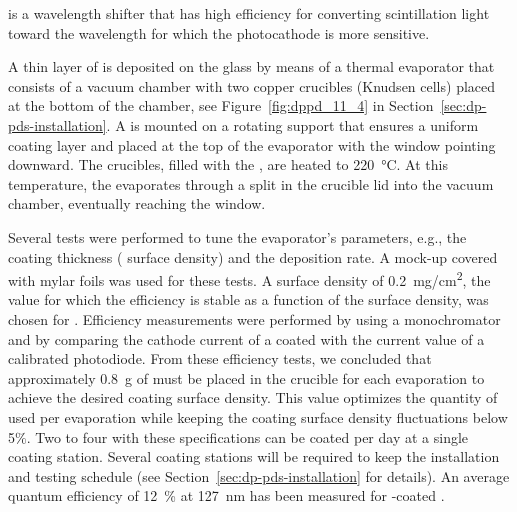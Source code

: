  is a wavelength shifter that has high efficiency for converting  scintillation  light toward the %
wavelength for which the  photocathode is more sensitive. 

A thin layer of  is deposited on the  glass by means of a thermal evaporator that consists of a vacuum chamber with two copper crucibles (Knudsen cells) placed at the bottom of the chamber, see Figure~\ref{fig:dppd_11_4} in Section~\ref{sec:dp-pds-installation}. A  is mounted on a rotating support that ensures a uniform coating layer and placed at the top of the evaporator with the   window pointing downward. The crucibles, filled with the , are heated to \SI{220}{\degreeCelsius}. At this temperature, the  evaporates through a split in the crucible lid into the vacuum chamber, eventually reaching the  window.

Several tests were performed to tune the evaporator's parameters, e.g., the coating thickness ( surface density) and the deposition rate. A  mock-up covered with mylar foils was used for these tests. A  surface density of \SI{0.2}{mg/cm^2}, the value for which the  efficiency is stable as a function of the surface density, was chosen for . Efficiency measurements were performed by using a  monochromator and by comparing the cathode current of a coated  with the current value of a calibrated photodiode. From these efficiency tests, we concluded that approximately \SI{0.8}{g} of  must be placed in the crucible for each evaporation to achieve the desired  coating surface density. %
This value optimizes the quantity of  used per evaporation while keeping the coating surface density fluctuations below \num{5}$\%$.  
Two to four   with these specifications can be coated per day at a single coating station. 
Several coating stations will be required to keep the installation and testing schedule (see Section~\ref{sec:dp-pds-installation} for details). An average quantum efficiency of \SI{12}{\%} at \SI{127}{\nano\m} has been measured for -coated  \cite{Bonesini:2018ubd}.

